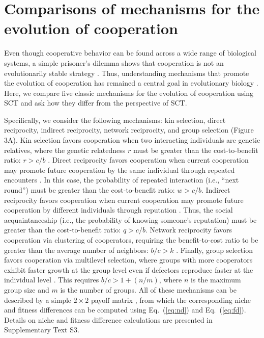 \documentclass[12pt]{article}
\newcommand{\eref}[1]{Eq.~(\ref{eq:#1})}
\begin{document}
\section*{Comparisons of mechanisms for the evolution of cooperation}

Even though cooperative behavior can be found across a wide range of biological systems, a simple prisoner's dilemma shows that cooperation is not an evolutionarily stable strategy \citep{axelrod1981evolution,may1987more}.
Thus, understanding mechanisms that promote the evolution of cooperation has remained a central goal in evolutionary biology \citep{west2007evolutionary,fletcher2008simple,clutton2009cooperation,kingma2014group,rakoff2016evolution,hilbe2018evolution,apicella2019evolution,west2021ten,lee2022bacterial,palmer2022bacterial,michel2024evolution}.
Here, we compare five classic mechanisms for the evolution of cooperation using SCT \citep{nowak2006five} and ask how they differ from the perspective of SCT.

Specifically, we consider the following mechanisms: kin selection, direct reciprocity, indirect reciprocity, network reciprocity, and group selection (Figure 3A).
Kin selection favors cooperation when two interacting individuals are genetic relatives, where the genetic relatedness $r$ must be greater than the cost-to-benefit ratio: $r > c/b$ \citep{hamilton1964genetical}.
Direct reciprocity favors cooperation when current cooperation may promote future cooperation by the same individual through repeated encounters \citep{trivers1971evolution,axelrod1981evolution}.
In this case, the probability of repeated interaction (i.e., ``next round'') must be greater than the cost-to-benefit ratio: $w > c/b$.
Indirect reciprocity favors cooperation when current cooperation may promote future cooperation by different individuals through reputation \citep{nowak1998evolution,wedekind2000cooperation,nowak2005evolution}.
Thus, the social acquaintanceship (i.e., the probability of knowing someone’s reputation) must be greater than the cost-to-benefit ratio: $q > c/b$.
Network reciprocity favors cooperation via clustering of cooperators, requiring the benefit-to-cost ratio to be greater than the average number of neighbors: $b/c > k$ \citep{nowak1992evolutionary,lieberman2005evolutionary}.
Finally, group selection favors cooperation via multilevel selection, where groups with more cooperators exhibit faster growth at the group level even if defectors reproduce faster at the individual level \citep{traulsen2006evolution}.
This requires $b/c > 1 + (n/m)$, where $n$ is the maximum group size and $m$ is the number of groups.
All of these mechanisms can be described by a simple $2\times 2$ payoff matrix \citep{nowak2006five}, from which the corresponding niche and fitness differences can be computed using \eref{nd} and \eref{fd}.
Details on niche and fitness difference calculations are presented in Supplementary Text S3.
\end{document}
